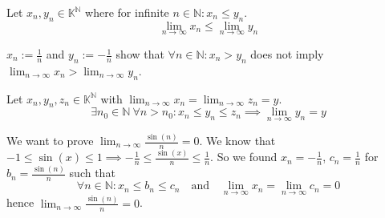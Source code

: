 \begin{proposition}\label{pro:limit_comp}
   Let \(x_n, y_n \in \mathbb{K}^\mathbb{N}\) where for infinite \(n \in \mathbb{N}: x_n \leq y_n\).
   \[\lim_{n \to \infty} x_n \leq \lim_{n \to \infty} y_n\]
\end{proposition}
\begin{remark}
   \(x_n := \frac{1}{n}\) and \(y_n := -\frac{1}{n}\) show that \(\forall n \in \mathbb{N}: x_n > y_n\) does not imply \(\lim_{n \to \infty} x_n > \lim_{n \to \infty} y_n\).
\end{remark}

\begin{proposition}\label{pro:sandwich_seq}
   Let \(x_n, y_n, z_n \in \mathbb{K}^\mathbb{N}\) with \(\lim_{n \to \infty} x_n = \lim_{n \to \infty} z_n = y\).
   \[\exists n_0 \in \mathbb{N}~\forall n > n_0: x_n \leq y_n \leq z_n \implies \lim_{n \to \infty} y_n = y\]
\end{proposition}
\begin{example}
   We want to prove \(\lim_{n \to \infty} \frac{\sin(n)}{n} = 0\).
   We know that \(-1 \leq \sin(x) \leq 1 \implies -\frac{1}{n} \leq \frac{\sin(x)}{n} \leq \frac{1}{n}\).
   So we found \(x_n = -\frac{1}{n}\), \(c_n = \frac{1}{n}\) for \(b_n = \frac{\sin(n)}{n}\) such that
   \[\forall n \in \mathbb{N}: x_n \leq b_n \leq c_n \quad\text{and}\quad \lim_{n \to \infty} x_n = \lim_{n \to \infty} c_n = 0\]
   hence \(\lim_{n \to \infty} \frac{\sin(n)}{n} = 0\).
\end{example}

